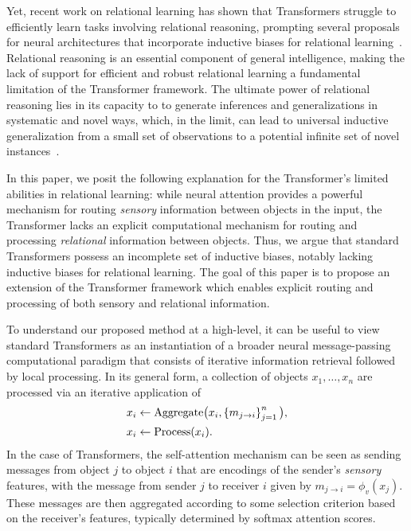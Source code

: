 Yet, recent work on relational learning has shown that Transformers struggle to efficiently learn tasks involving relational reasoning, prompting several proposals for neural architectures that incorporate inductive biases for relational learning~\citep{santoroSimpleNeuralNetwork2017,santoroRelationalRecurrentNeural2018,shanahanExplicitlyRelationalNeurala,webbEmergentSymbolsBinding2021,webbRelationalBottleneckInductive2024,kergNeuralArchitectureInductive2022,altabaa2024abstractors,altabaaLearningHierarchicalRelational2024}. Relational reasoning is an essential component of general intelligence, making the lack of support for efficient and robust relational learning a fundamental limitation of the Transformer framework. The ultimate power of relational reasoning lies in its capacity to to generate inferences and generalizations in systematic and novel ways, which, in the limit, can lead to universal inductive generalization from a small set of observations to a potential infinite set of novel instances~\citep{goyal2022inductive}.

In this paper, we posit the following explanation for the Transformer's limited abilities in relational learning: while neural attention provides a powerful mechanism for routing \textit{sensory} information between objects in the input, the Transformer lacks an explicit computational mechanism for routing and processing \textit{relational} information between objects. Thus, we argue that standard Transformers possess an incomplete set of inductive biases, notably lacking inductive biases for relational learning. The goal of this paper is to propose an extension of the Transformer framework which enables explicit routing and processing of both sensory and relational information.

To understand our proposed method at a high-level, it can be useful to view standard Transformers as an instantiation of a broader neural message-passing computational paradigm that consists of iterative information retrieval followed by local processing. In its general form, a collection of objects $x_1,\ldots, x_n$ are processed via an iterative application of
\begin{equation}\label{eq:intro_message_passing}
  \begin{split}
    x_i &\gets \mathrm{Aggregate}\big(x_i, \left\{m_{j \to i}\right\}_{j=1}^{n}\big), \\
    x_i &\gets \mathrm{Process}(x_i).
  \end{split}
\end{equation}
In the case of Transformers, the self-attention mechanism can be seen as sending messages from object $j$ to object $i$ that are encodings of the sender's \textit{sensory} features, with the message from sender $j$ to receiver $i$ given by $m_{j \to i} = \phi_v(x_j)$. These messages are then aggregated according to some selection criterion based on the receiver's features, typically determined by softmax attention scores.

